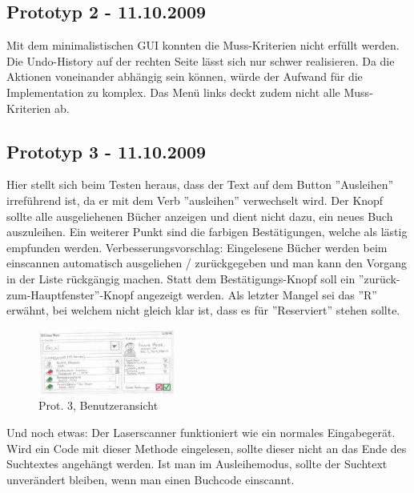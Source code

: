 \documentclass[10pt, a4paper]{scrartcl}
\begin{document}
\subsection{Prototyp 2 - 11.10.2009}
Mit dem minimalistischen GUI konnten die Muss-Kriterien nicht erfüllt werden. Die Undo-History auf der rechten Seite lässt sich nur schwer realisieren. Da die Aktionen voneinander abhängig sein können, würde der Aufwand für die Implementation zu komplex. Das Menü links deckt zudem nicht alle Muss-Kriterien ab.

\subsection{Prototyp 3 - 11.10.2009}
Hier stellt sich beim Testen heraus, dass der Text auf dem Button ''Ausleihen'' irreführend ist, da er mit dem Verb ''ausleihen'' verwechselt wird. Der Knopf sollte alle ausgeliehenen Bücher anzeigen und dient nicht dazu, ein neues Buch auszuleihen. Ein weiterer Punkt sind die farbigen Bestätigungen, welche als lästig empfunden werden. Verbesserungsvorschlag: Eingelesene Bücher werden beim einscannen automatisch ausgeliehen / zurückgegeben und man kann den Vorgang in der Liste rückgängig machen. Statt dem Bestätigungs-Knopf soll ein ''zurück-zum-Hauptfenster''-Knopf angezeigt werden. Als letzter Mangel sei das ''R'' erwähnt, bei welchem nicht gleich klar ist, dass es für ''Reserviert'' stehen sollte. 

\begin{figure}
  \begin{center}
   \includegraphics[width=45mm]{prototyp3Thumbnail} \\
   Prot. 3, Benutzeransicht
  \end{center}
\end{figure}

Und noch etwas: Der Laserscanner funktioniert wie ein normales Eingabegerät. Wird ein Code mit dieser Methode eingelesen, sollte dieser nicht an das Ende des Suchtextes angehängt werden. Ist man im Ausleihemodus, sollte der Suchtext unverändert bleiben, wenn man einen Buchcode einscannt.
\end{document}
